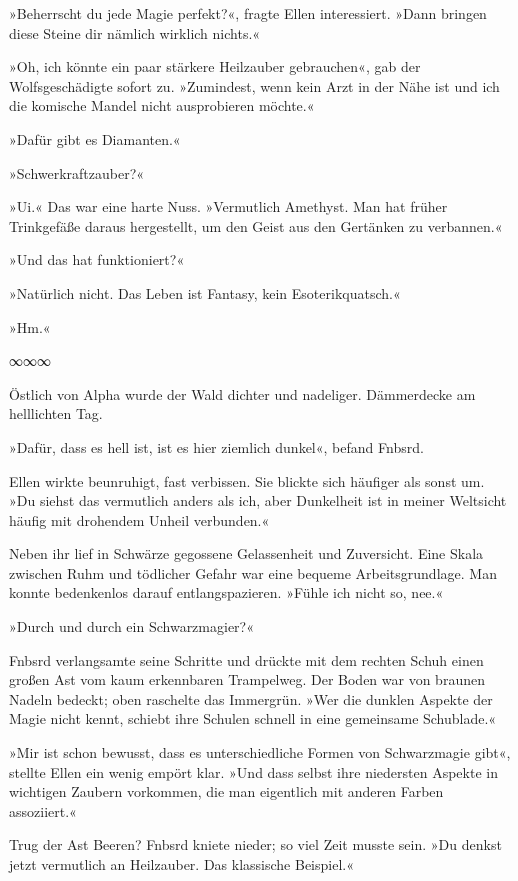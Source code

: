 »Beherrscht du jede Magie perfekt?«, fragte Ellen interessiert. »Dann bringen diese Steine dir nämlich wirklich nichts.«

»Oh, ich könnte ein paar stärkere Heilzauber gebrauchen«, gab der Wolfsgeschädigte sofort zu. »Zumindest, wenn kein Arzt in der Nähe ist und ich die komische Mandel nicht ausprobieren möchte.«

»Dafür gibt es Diamanten.«

»Schwerkraftzauber?«

»Ui.« Das war eine harte Nuss. »Vermutlich Amethyst. Man hat früher Trinkgefäße daraus hergestellt, um den Geist aus den Gertänken zu verbannen.«

»Und das hat funktioniert?«

»Natürlich nicht. Das Leben ist Fantasy, kein Esoterikquatsch.«

»Hm.«

\begin{center}
∞∞∞
\end{center}

Östlich von Alpha wurde der Wald dichter und nadeliger. Dämmerdecke am helllichten Tag.

»Dafür, dass es hell ist, ist es hier ziemlich dunkel«, befand Fnbsrd.

Ellen wirkte beunruhigt, fast verbissen. Sie blickte sich häufiger als sonst um. »Du siehst das vermutlich anders als ich, aber Dunkelheit ist in meiner Weltsicht häufig mit drohendem Unheil verbunden.«

Neben ihr lief in Schwärze gegossene Gelassenheit und Zuversicht. Eine Skala zwischen Ruhm und tödlicher Gefahr war eine bequeme Arbeitsgrundlage. Man konnte bedenkenlos darauf entlangspazieren. »Fühle ich nicht so, nee.«

»Durch und durch ein Schwarzmagier?«

Fnbsrd verlangsamte seine Schritte und drückte mit dem rechten Schuh einen großen Ast vom kaum erkennbaren Trampelweg. Der Boden war von braunen Nadeln bedeckt; oben raschelte das Immergrün. »Wer die dunklen Aspekte der Magie nicht kennt, schiebt ihre Schulen schnell in eine gemeinsame Schublade.«

»Mir ist schon bewusst, dass es unterschiedliche Formen von Schwarzmagie gibt«, stellte Ellen ein wenig empört klar. »Und dass selbst ihre niedersten Aspekte in wichtigen Zaubern vorkommen, die man eigentlich mit anderen Farben assoziiert.«

Trug der Ast Beeren? Fnbsrd kniete nieder; so viel Zeit musste sein. »Du denkst jetzt vermutlich an Heilzauber. Das klassische Beispiel.«

